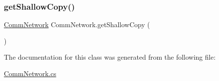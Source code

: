 \subsubsection{\texorpdfstring{get\+Shallow\+Copy()}{getShallowCopy()}}
{\footnotesize\ttfamily \mbox{\hyperlink{class_comm_network}{Comm\+Network}} Comm\+Network.\+get\+Shallow\+Copy (\begin{DoxyParamCaption}{ }\end{DoxyParamCaption})}



The documentation for this class was generated from the following file\+:\begin{DoxyCompactItemize}
\item 
\mbox{\hyperlink{_comm_network_8cs}{Comm\+Network.\+cs}}\end{DoxyCompactItemize}

